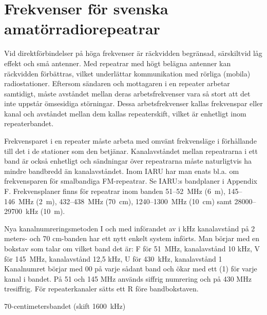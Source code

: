 \chapter{Frekvenser för svenska amatörradiorepeatrar}
Vid direktförbindelser på höga frekvenser är räckvidden begränsad,
särskiltvid låg effekt och små antenner.
Med repeatrar med högt belägna antenner kan räckvidden förbättras,
vilket underlättar kommunikation med rörliga (mobila) radiostationer.
Eftersom sändaren och mottagaren i en repeater arbetar samtidigt, måste avståndet
mellan deras arbetsfrekvenser vara så stort att det inte uppstår ömsesidiga störningar.
Dessa arbetsfrekvenser kallas frekvenspar eller kanal och avståndet mellan dem
kallas repeaterskift, vilket är enhetligt inom repeaterbandet.

Frekvensparet i en repeater måste arbeta med omvänt frekvensläge i förhållande
till det i de stationer som den betjänar.
Kanalavståndet mellan repeatrarna i ett band är också enhetligt och sändningar över
repeatrarna måste naturligtvis ha mindre bandbredd än kanalavståndet.
Inom IARU har man enats bl.a. om frekvensparen för smalbandiga FM-repeatrar.
Se IARU:s bandplaner i Appendix F.
Frekvensplaner finns för repeatrar inom banden 51--52~MHz (6~m), 145--146~MHz
(2~m), 432--438~MHz (70~cm), 1240--1300~MHz (10~cm) samt 28000--29700~kHz (10~m).

Nya kanalnumreringsmetoden
I och med införandet av i kHz kanalavstånd på 2 meters- och 70 cm-banden har
ett nytt enkelt system införts.
Man börjar med en bokstav som talar om vilket band det är:
F för 51~MHz, kanalavstånd 10 kHz,
V för 145~MHz, kanalavstånd 12,5 kHz, 
U för 430~kHz, kanalavstånd 1
Kanalnumret börjar med 00 på varje sådant band och ökar med ett (1) för varje
kanal i bandet.
På 51 och 145 MHz används siffrig numrering och på 430 MHz tresiffrig.
För repeaterkanaler sätts ett R före bandbokstaven.

70-centimetersbandet (skift 1600~kHz)

